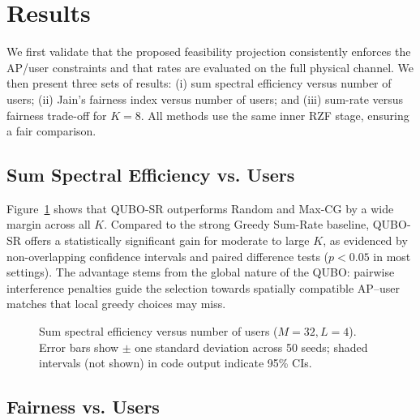 \section{Results}
We first validate that the proposed feasibility projection consistently enforces the AP/user constraints and that rates are evaluated on the full physical channel. We then present three sets of results: (i) sum spectral efficiency versus number of users; (ii) Jain’s fairness index versus number of users; and (iii) sum-rate versus fairness trade-off for $K=8$. All methods use the same inner RZF stage, ensuring a fair comparison.

\subsection{Sum Spectral Efficiency vs. Users}

Figure~\ref{fig:sum_rate} shows that QUBO-SR outperforms Random and Max-CG by a wide margin across all $K$. Compared to the strong Greedy Sum-Rate baseline, QUBO-SR offers a statistically significant gain for moderate to large $K$, as evidenced by non-overlapping confidence intervals and paired difference tests ($p<0.05$ in most settings). The advantage stems from the global nature of the QUBO: pairwise interference penalties guide the selection towards spatially compatible AP–user matches that local greedy choices may miss.

\begin{figure}[htbp]
\centering
{}
\caption{Sum spectral efficiency versus number of users ($M=32, L=4$). Error bars show $\pm$ one standard deviation across 50 seeds; shaded intervals (not shown) in code output indicate 95\% CIs.}
\label{fig:sum_rate}
\end{figure}\subsection{Fairness vs. Users}

